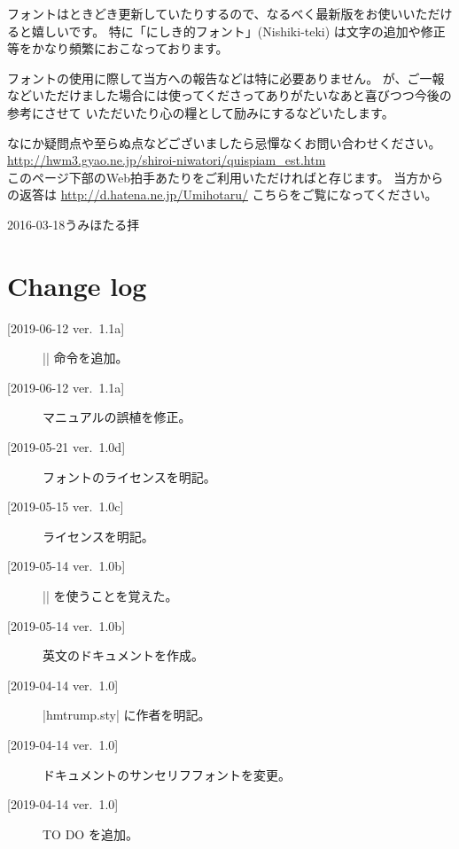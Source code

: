 \documentclass{jlreq}
\begin{document}
フォントはときどき更新していたりするので、なるべく最新版をお使いいただけると嬉しいです。
特に「にしき的フォント」(Nishiki-teki) は文字の追加や修正等をかなり頻繁におこなっております。

フォントの使用に際して当方への報告などは特に必要ありません。
が、ご一報などいただけました場合には使ってくださってありがたいなあと喜びつつ今後の参考にさせて
いただいたり心の糧として励みにするなどいたします。

なにか疑問点や至らぬ点などございましたら忌憚なくお問い合わせください。\\
\url{http://hwm3.gyao.ne.jp/shiroi-niwatori/quispiam_est.htm}\\
このページ下部のWeb拍手あたりをご利用いただければと存じます。
当方からの返答は \url{http://d.hatena.ne.jp/Umihotaru/} こちらをご覧になってください。


\hspace{3\zw}2016-03-18\hspace{1\zw}うみほたる拝
\egroup

\section{Change log}
\begin{description}
\item[{[2019-06-12 ver.~1.1a]}] |\unitrump| 命令を追加。
\item[{[2019-06-12 ver.~1.1a]}] マニュアルの誤植を修正。
\item[{[2019-05-21 ver.~1.0d]}] フォントのライセンスを明記。
\item[{[2019-05-15 ver.~1.0c]}] ライセンスを明記。
\item[{[2019-05-14 ver.~1.0b]}] |\@undefined| を使うことを覚えた。
\item[{[2019-05-14 ver.~1.0b]}] 英文のドキュメントを作成。
\item[{[2019-04-14 ver.~1.0]}] |hmtrump.sty| に作者を明記。
\item[{[2019-04-14 ver.~1.0]}] ドキュメントのサンセリフフォントを変更。
\item[{[2019-04-14 ver.~1.0]}] TO DO を追加。
\end{description}
\end{document}
